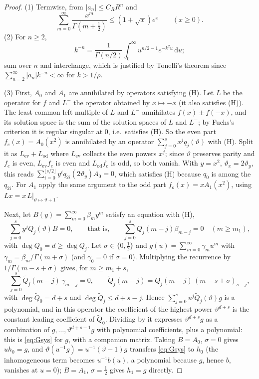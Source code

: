 \documentclass[11pt]{amsart}
\theoremstyle{definition}
\theoremstyle{remark}
\newcommand{\dd}{\,\mathrm{d}}
\begin{document}
\begin{proof}
(1) Termwise, from $|a_n| \le C_R R^n$ and
\[
  \sum_{m=0}^{\infty} \frac{x^m}{\Gamma(m+\frac12)} \le (1+\sqrt x)e^x \qquad (x \ge 0).
\]
(2) For $n \ge 2$,
\[
  k^{-n} = \frac{1}{\Gamma(n/2)}\int_0^\infty u^{n/2-1}e^{-k^2u}\dd u;
\]
sum over $n$ and interchange, which is justified by Tonelli's theorem since $\sum_{n=2}^{\infty} |a_n| k^{-n} < \infty$ for
$k > 1/\rho$.

(3) First, $A_0$ and $A_1$ are annihilated by operators satisfying (H). Let $L$ be the operator for $f$ and
$L^-$ the operator obtained by $x \mapsto -x$ (it also satisfies (H)). The least common left multiple
of $L$ and $L^-$ annihilates $f(x) \pm f(-x)$, and its solution space is the sum of the solution spaces of $L$
and $L^-$; by Fuchs's criterion it is regular singular at $0$, i.e.\ satisfies (H). So the even part
$f_e(x) = A_0(x^2)$ is annihilated by an operator $\sum_{j=0}^{s} x^j q_j(\vartheta)$ with (H). Split it as
$L_{\mathrm{ev}} + L_{\mathrm{od}}$ where $L_{\mathrm{ev}}$ collects the even powers $x^j$; since $\vartheta$ preserves parity and $f_e$ is even,
$L_{\mathrm{ev}} f_e$ is even and $L_{\mathrm{od}} f_e$ is odd, so both vanish. With $y = x^2$, $\vartheta_x = 2\vartheta_y$, this reads
$\sum_{i=0}^{\lfloor s/2\rfloor} y^i q_{2i}(2\vartheta_y) A_0 = 0$, which satisfies (H) because $q_0$ is among the $q_{2i}$.
For $A_1$ apply the same argument to the odd part $f_o(x) = xA_1(x^2)$, using
$L x = x\,L|_{\vartheta \mapsto \vartheta+1}$.

Next, let $B(y) = \sum_{m=0}^{\infty} \beta_m y^m$ satisfy an equation with (H),
\[
  \sum_{j=0}^s y^j Q_j(\vartheta)B = 0, \qquad\text{that is,}\qquad
  \sum_{j=0}^{s} Q_j(m-j)\beta_{m-j} = 0 \quad (m \ge m_1),
\]
with $\deg Q_0 = d \ge \deg Q_j$. Let $\sigma \in \{0,\frac12\}$ and $g(u) = \sum_{m=0}^{\infty} \gamma_m u^m$ with
$\gamma_m = \beta_m/\Gamma(m+\sigma)$ (and $\gamma_0 = 0$ if $\sigma = 0$). Multiplying the recurrence by $1/\Gamma(m - s + \sigma)$ gives, for $m \ge m_1 + s$,
\[
  \sum_{j=0}^s \widetilde Q_j(m-j)\, \gamma_{m-j} = 0, \qquad
  \widetilde Q_j(m - j) = Q_j(m-j)\, (m - s + \sigma)_{s-j},
\]
with $\deg \widetilde Q_0 = d + s$ and $\deg \widetilde Q_j \le d + s - j$. Hence
$\sum_{j=0}^{s} u^j \widetilde Q_j(\vartheta) g$ is a polynomial, and in this operator the coefficient of the
highest power $\vartheta^{d+s}$ is the constant leading coefficient of $\widetilde Q_0$. Dividing by it
expresses $\vartheta^{d+s}g$ as a combination of $g, \dots, \vartheta^{d+s-1}g$ with polynomial
coefficients, plus a polynomial: this is \eqref{eq:Gsys} for $g$, with a companion matrix. Taking
$B = A_0$, $\sigma = 0$ gives $u h_0 = g$, and $\vartheta(u^{-1}g) = u^{-1}(\vartheta - 1)g$ transfers
\eqref{eq:Gsys} to $h_0$ (the inhomogeneous term becomes $u^{-1}b(u)$, a polynomial because $g$, hence
$b$, vanishes at $u = 0$); $B = A_1$, $\sigma = \frac12$ gives $h_1 = g$ directly.
\end{proof}
\end{document}
